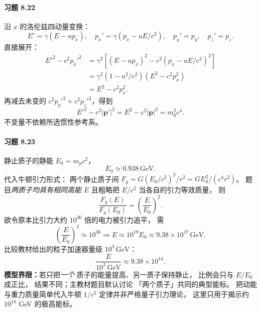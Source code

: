 \paragraph{习题 8.22}
沿 \(x\) 的洛伦兹四动量变换：
\[
 E'=\gamma(E-up_x),\quad
 p_x'=\gamma(p_x-uE/c^2),\quad
 p_y'=p_y,\quad p_z'=p_z.
\]
直接展开：
\[
 \begin{aligned}
 E'^2-c^2p_x'^2
 &=\gamma^2[(E-up_x)^2
 -c^2(p_x-uE/c^2)^2]\\
 &=\gamma^2(1-u^2/c^2)
 (E^2-c^2p_x^2)\\
 &=E^2-c^2p_x^2.
 \end{aligned}
\]
再减去未变的
\(c^2p_y'^2+c^2p_z'^2\)，得到
\[
 \boxed{E'^2-c^2|\boldsymbol p'|^2
 =E^2-c^2|\boldsymbol p|^2
 =m_0^2c^4}.
\]
不变量不依赖所选惯性参考系。

\paragraph{习题 8.23}
静止质子的静能
\(E_0=m_pc^2\)，
\[
 \boxed{E_0\simeq0.938\,\mathrm{GeV}}.
\]
代入牛顿引力形式：
两个静止质子间
\(F_g=G(E_0/c^2)^2/r^2
 =GE_0^2/(c^4r^2)\)。
题目\emph{两质子均具有相同高能 \(E\)}
且粗略把 \(E/c^2\) 当各自的引力等效质量，
则
\[
 \frac{F_g(E)}{F_g(E_0)}
 =\left(\frac{E}{E_0}\right)^2.
\]
欲令原本比引力大约
\(10^{36}\) 倍的电力被引力追平，
需
\[
 \left(\frac{E}{E_0}\right)^2\simeq10^{36}
 \Longrightarrow
 \boxed{E\simeq10^{18}E_0
 \approx9.38\times10^{17}\,\mathrm{GeV}}.
\]
比较教材给出的粒子加速器量级
\(10^3\,\mathrm{GeV}\)：
\[
 \boxed{\frac{E}{10^3\,\mathrm{GeV}}
 \approx9.38\times10^{14}}.
\]
\textbf{模型界限：}若只把\emph{一个}
质子的能量提高、另一质子保持静止，
比例会只与 \(E/E_0\) 成正比，
结果不同；主教材题目默认讨论
「两个质子」共同的典型能标。
把动能与重力质量简单代入牛顿
\(1/r^2\) 定律并非严格量子引力理论，
这里只用于揭示约 \(10^{18}\) GeV 的极高能标。

